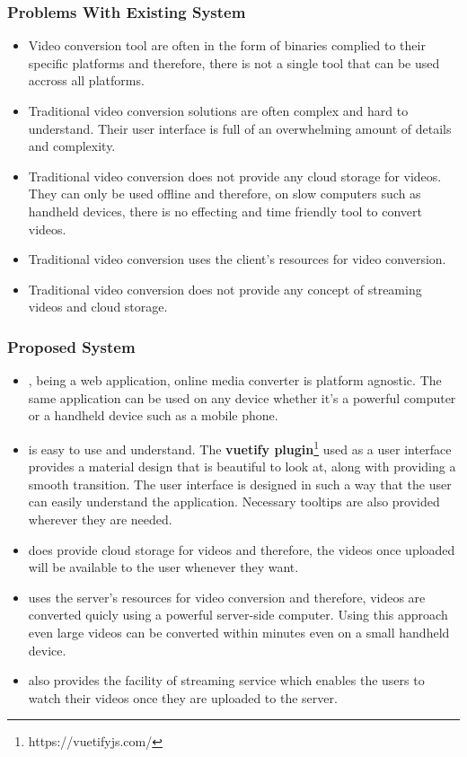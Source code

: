 	\subsubsection{Problems With Existing System}
	\vs
	\begin{itemize}
		\item Video conversion tool are often in the form of binaries complied to their specific platforms and therefore, there is not a single tool that can be used accross all platforms.
		\item Traditional video conversion solutions are often complex and hard to understand. Their user interface is full of an overwhelming amount of details and complexity.
		\item Traditional video conversion does not provide any cloud storage for videos. They can only be used offline and therefore, on slow computers such as handheld devices, there is no effecting and time friendly tool to convert videos.
		\item Traditional video conversion uses the client’s resources for video conversion.
		\item Traditional video conversion does not provide any concept of streaming videos and cloud storage. 
	\end{itemize}
	\vs
	\subsubsection{Proposed System}
	\vs
	\begin{itemize}
		\item \projectname, being a web application, online media converter is platform agnostic. The same application can be used on any device whether it's a powerful computer or a handheld device such as a mobile phone.
		
		\item \projectname\space is easy to use and understand. The \textbf{{vuetify plugin}}\footnote{https://vuetifyjs.com/} used as a user interface provides a material design that is beautiful to look at, along with providing a smooth transition. The user interface is designed in such a way that the user can easily understand the application. Necessary tooltips are also provided wherever they are needed.
		\item \projectname\space does provide cloud storage for videos and therefore, the videos once uploaded will be available to the user whenever they want. 
		\item \projectname\space uses the server’s resources for video conversion and therefore, videos are converted quicly using a powerful server-side computer. Using this approach even large videos can be converted within minutes even on a small handheld device.
		\item \projectname\space also provides the facility of streaming service which enables the users to watch their videos once they are uploaded to the server.
	\end{itemize}
	\vs
